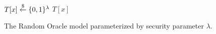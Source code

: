 \begin{figure}[ht]
\begin{algorithm}[H]
    \caption{\label{alg.ro} The Random Oracle model parameterized by security
             parameter $\lambda$.}
    \begin{algorithmic}[1]
                \State$T[x] \overset{\$}{\gets} \{0, 1\}^\lambda$
            \EndIf
            \State\Return$T[x]$
        \EndFunction
        \vskip8pt
    \end{algorithmic}
\end{algorithm}
\end{figure}
